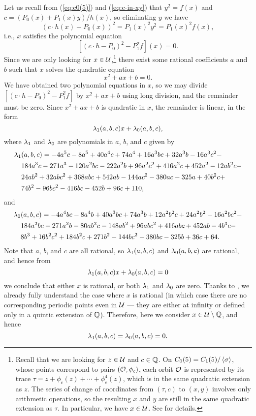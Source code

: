 Let us recall from (\ref{eq:c0(5)}) and (\ref{eq:c-in-xy}) that $y^2 =
f(x)$ and $c = (P_0(x) + P_1(x) y)/h(x)$, so eliminating $y$ we have
\[
(c \cdot h(x) - P_0(x))^2 = P_1(x)^2 y^2 = P_1(x)^2 f(x),
\]
i.e., $x$ satisfies the polynomial equation
\[
[(c \cdot h - P_0)^2 - P_1^2 f](x) = 0.
\]
Since we are only looking for $x \in \mathcal{U}$,\footnote{%
  Recall that we are looking for $z \in \mathcal{U}$ and $c \in \mathbb{Q}$. On $C_0(5)
  = C_1(5) / \left<\sigma\right>$, whose points correspond to pairs $(\mathcal{O},
  \phi_c)$, each orbit $\mathcal{O}$ is represented by its trace $\tau = z +
  \phi_c(z) + \cdots + \phi_c^4(z)$, which is in the same quadratic
  extension as $z$. The series of change of coordinates from $(\tau,
  c)$ to $(x, y)$ involves only arithmetic operations, so the
  resulting $x$ and $y$ are still in the same quadratic extension as
  $\tau$. In particular, we have $x \in \mathcal{U}$. See \cite{MR1480542} for
  details.}
there exist some rational coefficients $a$ and $b$ such that $x$
solves the quadratic equation
\[
x^2 + a x + b = 0.
\]
We have obtained two polynomial equations in $x$, so we may divide
$[(c \cdot h - P_0)^2 - P_1^2 f]$ by $x^2 + ax + b$ using long
division, and the remainder must be zero. Since $x^2 + ax + b$ is
quadratic in $x$, the remainder is linear, in the form
\[
\lambda_1(a, b, c) x + \lambda_0(a, b, c),
\]
where $\lambda_1$ and $\lambda_0$ are polynomials in $a$, $b$, and $c$ given by
\[
\begin{aligned}
  \lambda_1&(a, b, c) = - 4a^5c - 8a^5 + 40a^4c + 74a^4 + 16a^3bc + 32a^3b
  - 16a^3c^2 - \\
  & 184a^3c - 271a^3 - 120a^2bc - 222a^2b + 96a^2c^2 + 416a^2c + 452a^2 -
  12ab^2c - \\
  & 24ab^2 + 32abc^2 + 368abc + 542ab - 144ac^2 - 380ac - 325a + 40b^2c + \\
  & 74b^2 - 96bc^2 - 416bc - 452b + 96c + 110,
\end{aligned}
\]
and
\[
\begin{aligned}
  \lambda_0&(a, b, c) = - 4a^4bc - 8a^4b + 40a^3bc + 74a^3b + 12a^2b^2c +
  24a^2b^2 - 16a^2bc^2 - \\
  & 184a^2bc - 271a^2b - 80ab^2c - 148ab^2 + 96abc^2 +
  416abc + 452ab - 4b^3c - \\
  & 8b^3 + 16b^2c^2 + 184b^2c + 271b^2 - 144bc^2 - 380bc -
  325b + 36c + 64.
\end{aligned}
\]
Note that $a$, $b$, and $c$ are all rational, so $\lambda_1(a, b, c)$ and
$\lambda_0(a, b, c)$ are rational, and hence from
\[
\lambda_1(a, b, c) x + \lambda_0(a, b, c) = 0
\]
we conclude that either $x$ is rational, or both $\lambda_1$ and $\lambda_0$ are
zero. Thanks to \cite{MR1480542}, we already fully understand the case
where $x$ is rational (in which case there are no corresponding
periodic points even in $\mathcal{U}$ --- they are either at infinity or
defined only in a quintic extension of $\mathbb{Q}$). Therefore, here we
consider $x \in \mathcal{U} \setminus \mathbb{Q}$, and hence
\[
\lambda_1(a, b, c) = \lambda_0(a, b, c) = 0.
\]

